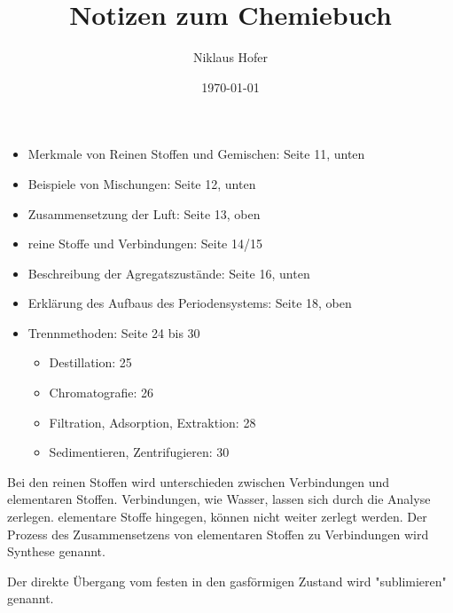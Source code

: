 \documentclass[11pt,paper=a4,final]{scrartcl}
\title{Notizen zum Chemiebuch}
\author{Niklaus Hofer}
\date{\today{}}
\begin{document}
\maketitle

\begin{itemize}
  \item Merkmale von Reinen Stoffen und Gemischen: Seite 11, unten
  \item Beispiele von Mischungen: Seite 12, unten
  \item Zusammensetzung der Luft: Seite 13, oben
  \item reine Stoffe und Verbindungen: Seite 14/15
  \item Beschreibung der Agregatszust\"ande: Seite 16, unten
  \item Erkl\"arung des Aufbaus des Periodensystems: Seite 18, oben
  \item Trennmethoden: Seite 24 bis 30
    \begin{itemize}
      \item Destillation: 25
      \item Chromatografie: 26
      \item Filtration, Adsorption, Extraktion: 28
      \item Sedimentieren, Zentrifugieren: 30
    \end{itemize}
\end{itemize}

Bei den reinen Stoffen wird unterschieden zwischen Verbindungen und elementaren Stoffen. Verbindungen, wie Wasser, lassen sich durch die Analyse zerlegen. elementare Stoffe hingegen, k\"onnen nicht weiter zerlegt werden. Der Prozess des Zusammensetzens von elementaren Stoffen zu Verbindungen wird Synthese genannt. 

Der direkte \"Ubergang vom festen in den gasf\"ormigen Zustand wird "sublimieren" genannt.
\end{document}
